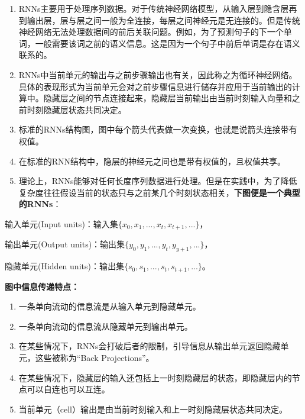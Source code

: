 \begin{enumerate}
\def\labelenumi{\arabic{enumi}.}
\item
  RNNs主要用于处理序列数据。对于传统神经网络模型，从输入层到隐含层再到输出层，层与层之间一般为全连接，每层之间神经元是无连接的。但是传统神经网络无法处理数据间的前后关联问题。例如，为了预测句子的下一个单词，一般需要该词之前的语义信息。这是因为一个句子中前后单词是存在语义联系的。
\item
  RNNs中当前单元的输出与之前步骤输出也有关，因此称之为循环神经网络。具体的表现形式为当前单元会对之前步骤信息进行储存并应用于当前输出的计算中。隐藏层之间的节点连接起来，隐藏层当前输出由当前时刻输入向量和之前时刻隐藏层状态共同决定。
\item
  标准的RNNs结构图，图中每个箭头代表做一次变换，也就是说箭头连接带有权值。
\item
  在标准的RNN结构中，隐层的神经元之间也是带有权值的，且权值共享。
\item
  理论上，RNNs能够对任何长度序列数据进行处理。但是在实践中，为了降低复杂度往往假设当前的状态只与之前某几个时刻状态相关，\textbf{下图便是一个典型的RNNs}：
\end{enumerate}



输入单元(Input
units)：输入集\(\bigr\{x_0,x_1,...,x_t,x_{t+1},...\bigr\}\)，

输出单元(Output
units)：输出集\(\bigr\{y_0,y_1,...,y_t,y_{y+1},...\bigr\}\)，

隐藏单元(Hidden
units)：输出集\(\bigr\{s_0,s_1,...,s_t,s_{t+1},...\bigr\}\)。

\textbf{图中信息传递特点：}

\begin{enumerate}
\def\labelenumi{\arabic{enumi}.}
\item
  一条单向流动的信息流是从输入单元到隐藏单元。
\item
  一条单向流动的信息流从隐藏单元到输出单元。
\item
  在某些情况下，RNNs会打破后者的限制，引导信息从输出单元返回隐藏单元，这些被称为``Back
  Projections''。
\item
  在某些情况下，隐藏层的输入还包括上一时刻隐藏层的状态，即隐藏层内的节点可以自连也可以互连。
\item
  当前单元（cell）输出是由当前时刻输入和上一时刻隐藏层状态共同决定。
\end{enumerate}

